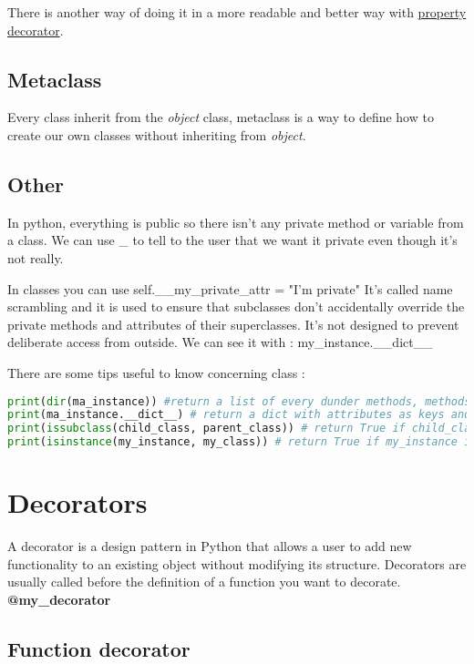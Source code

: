 \documentclass[a4paper, 12pt, titlepage]{scrartcl} %
\begin{document}
There is another way of doing it in a more readable and better way with \hyperref[subsec:Property]{property decorator}.

\subsection{Metaclass}
Every class inherit from the \textit{object} class, metaclass is a way to define how to create our own classes without inheriting from \textit{object}.

\subsection{Other}
In python, everything is public so there isn't any private method or variable from a class. We can use \_ to tell to the user that we want it private even though it's not really.

In classes you can use self.\_\_my\_private\_attr = "I'm private" 
It's called name scrambling and it is used to ensure that subclasses don't accidentally override the private methods and attributes of their superclasses. It's not designed to prevent deliberate access from outside. We can see it with : my\_instance.\_\_dict\_\_

There are some tips useful to know concerning class :
\begin{lstlisting}[language=Python]
print(dir(ma_instance)) #return a list of every dunder methods, methods and attributes from the class.
print(ma_instance.__dict__) # return a dict with attributes as keys and their value. associated.
print(issubclass(child_class, parent_class)) # return True if child_class is the child of parent_class.
print(isinstance(my_instance, my_class)) # return True if my_instance is an instance from my_class.
\end{lstlisting} \vspace{5mm}

\newpage
\section{Decorators}
A decorator is a design pattern in Python that allows a user to add new functionality to an existing object without modifying its structure. Decorators are usually called before the definition of a function you want to decorate. \textbf{@my\_decorator}\newline

\subsection{Function decorator}
\end{document}
